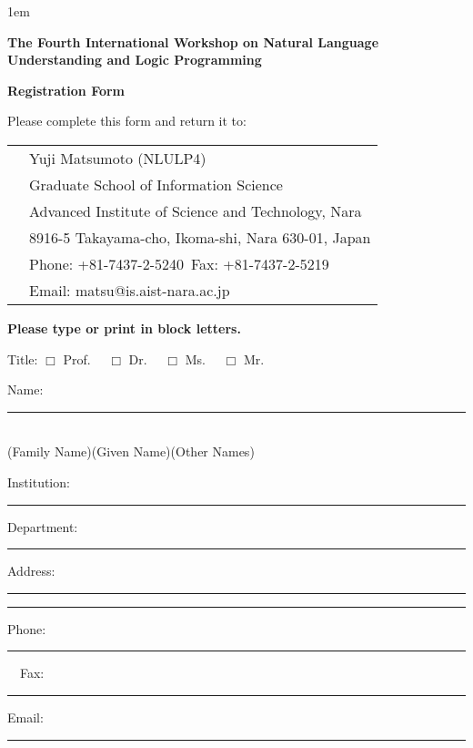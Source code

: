 
\topmargin -20mm
\oddsidemargin 0mm
\textheight 240mm
\textwidth 160mm

\parindent 0pt
\parskip 1em

\pagestyle{empty}



\begin{center}
{\large\bf The Fourth International Workshop on Natural Language Understanding
and Logic Programming}

{\Large\bf Registration Form}
\end{center}

Please complete this form and return it to:

\begin{tabular}{ll}
\hspace*{5mm}	& Yuji Matsumoto (NLULP4)\\
		& Graduate School of Information Science\\
		& Advanced Institute of Science and Technology, Nara\\
		& 8916-5 Takayama-cho, Ikoma-shi, Nara 630-01, Japan\\
		& Phone: +81-7437-2-5240\ Fax:   +81-7437-2-5219\\
		& Email: {\sf matsu@is.aist-nara.ac.jp}
\end{tabular}

{\bf Please type or print in block letters.}

Title: $\Box$ Prof. \ \ $\Box$ Dr. \ \ $\Box$ Ms. \ \ $\Box$ Mr.

Name: \rule[-1mm]{143mm}{.1mm}\\
\hspace*{15mm}(Family Name)\hspace{30mm}(Given
Name)\hspace{30mm}(Other Names)

Institution: \rule[-1mm]{135mm}{.1mm}

Department: \rule[-1mm]{133mm}{.1mm}

Address: \rule[-1mm]{140mm}{.1mm}

\hspace*{15mm} \rule[-1mm]{140mm}{.1mm}

Phone: \rule[-1mm]{66mm}{.1mm}\ \ Fax: \rule[-1mm]{66mm}{.1mm}

Email: \rule[-1mm]{143mm}{.1mm}

